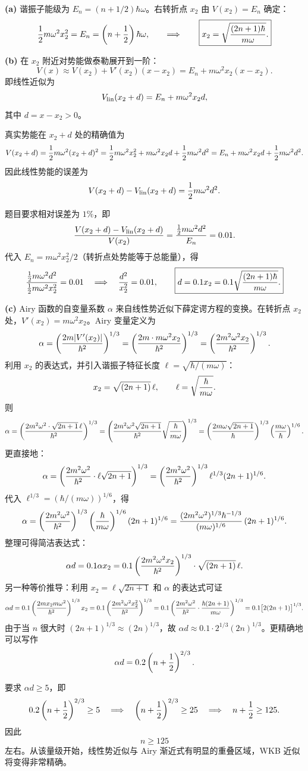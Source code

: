 \begin{solution}
\textbf{(a)} 谐振子能级为 $E_n=(n+1/2)\hbar\omega$。右转折点 $x_2$ 由 $V(x_2)=E_n$ 确定：
\[
{1\over2}m\omega^2x_2^2=E_n=\left(n+{1\over2}\right)\hbar\omega,
\qquad\Longrightarrow\qquad
\boxed{x_2=\sqrt{{(2n+1)\hbar\over m\omega}}.}
\]

\textbf{(b)} 在 $x_2$ 附近对势能做泰勒展开到一阶：
\[
V(x)\approx V(x_2)+V'(x_2)(x-x_2)=E_n+m\omega^2x_2(x-x_2).
\]
即线性近似为
\[
V_{\rm lin}(x_2+d)=E_n+m\omega^2x_2d,
\]
其中 $d=x-x_2>0$。

真实势能在 $x_2+d$ 处的精确值为
\[
V(x_2+d)={1\over2}m\omega^2(x_2+d)^2
={1\over2}m\omega^2x_2^2+m\omega^2x_2d+{1\over2}m\omega^2d^2
=E_n+m\omega^2x_2d+{1\over2}m\omega^2d^2.
\]
因此线性势能的误差为
\[
V(x_2+d)-V_{\rm lin}(x_2+d)={1\over2}m\omega^2d^2.
\]

题目要求相对误差为 $1\%$，即
\[
{V(x_2+d)-V_{\rm lin}(x_2+d)\over V(x_2)}
={{1\over2}m\omega^2d^2\over E_n}=0.01.
\]
代入 $E_n=m\omega^2x_2^2/2$（转折点处势能等于总能量），得
\[
{{1\over2}m\omega^2d^2\over{1\over2}m\omega^2x_2^2}=0.01
\quad\Longrightarrow\quad
{d^2\over x_2^2}=0.01,
\qquad
\boxed{d=0.1x_2=0.1\sqrt{{(2n+1)\hbar\over m\omega}}.}
\]

\textbf{(c)} Airy 函数的自变量系数 $\alpha$ 来自线性势近似下薛定谔方程的变换。在转折点 $x_2$ 处，$V'(x_2)=m\omega^2x_2$。Airy 变量定义为
\[
\alpha=\left({2m|V'(x_2)|\over\hbar^2}\right)^{1/3}
=\left({2m\cdot m\omega^2x_2\over\hbar^2}\right)^{1/3}
=\left({2m^2\omega^2x_2\over\hbar^2}\right)^{1/3}.
\]
利用 $x_2$ 的表达式，并引入谐振子特征长度 $\ell=\sqrt{\hbar/(m\omega)}$：
\[
x_2=\sqrt{(2n+1)}\,\ell,\qquad
\ell=\sqrt{\hbar\over m\omega}.
\]
则
\[
\alpha=\left({2m^2\omega^2\cdot\sqrt{2n+1}\,\ell\over\hbar^2}\right)^{1/3}
=\left({2m^2\omega^2\sqrt{2n+1}\over\hbar^2}\sqrt{\hbar\over m\omega}\right)^{1/3}
=\left({2m\omega\sqrt{2n+1}\over\hbar}\right)^{1/3}
\left({m\omega\over\hbar}\right)^{1/6}.
\]
更直接地：
\[
\alpha=\left({2m^2\omega^2\over\hbar^2}\cdot\ell\sqrt{2n+1}\right)^{1/3}
=\left({2m^2\omega^2\over\hbar^2}\right)^{1/3}
\ell^{1/3}(2n+1)^{1/6}.
\]
代入 $\ell^{1/3}=(\hbar/(m\omega))^{1/6}$，得
\[
\alpha=\left({2m^2\omega^2\over\hbar^2}\right)^{1/3}
\left({\hbar\over m\omega}\right)^{1/6}(2n+1)^{1/6}
={ (2m^2\omega^2)^{1/3}\hbar^{-1/3}\over (m\omega)^{1/6}}\,(2n+1)^{1/6}.
\]
整理可得简洁表达式：
\[
\alpha d=0.1\alpha x_2=0.1\left({2m^2\omega^2x_2\over\hbar^2}\right)^{1/3}
\cdot\sqrt{(2n+1)}\,\ell.
\]
另一种等价推导：利用 $x_2=\ell\sqrt{2n+1}$ 和 $\alpha$ 的表达式可证
\[
\alpha d=0.1\left({2mx_2m\omega^2\over\hbar^2}\right)^{1/3}x_2
=0.1\left({2m^2\omega^2x_2^2\over\hbar^2}\right)^{1/3}
=0.1\left({2m^2\omega^2\over\hbar^2}\cdot{\hbar(2n+1)\over m\omega}\right)^{1/3}
=0.1\bigl[2(2n+1)\bigr]^{1/3}.
\]
由于当 $n$ 很大时 $(2n+1)^{1/3}\approx(2n)^{1/3}$，故 $\alpha d\approx0.1\cdot2^{1/3}(2n)^{1/3}$。更精确地可以写作
\[
\alpha d=0.2\left(n+{1\over2}\right)^{2/3}.
\]

要求 $\alpha d\ge5$，即
\[
0.2\left(n+{1\over2}\right)^{2/3}\ge5
\quad\Longrightarrow\quad
\left(n+{1\over2}\right)^{2/3}\ge25
\quad\Longrightarrow\quad
n+{1\over2}\ge125.
\]
因此
\[
\boxed{n\ge125}
\]
左右。从该量级开始，线性势近似与 Airy 渐近式有明显的重叠区域，WKB 近似将变得非常精确。
\end{solution}

